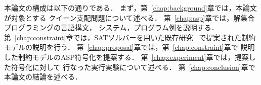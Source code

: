 本論文の構成は以下の通りである．
まず，第~\ref{chap:background}章では，本論文が対象とする
クイーン支配問題について述べる．
第~\ref{chap:asp}章では，解集合プログラミングの言語構文，
システム，プログラム例を説明する．
第~\ref{chap:constraint}章では，SATソルバーを用いた既存研究~\cite{yamamoto21}
で提案された制約モデルの説明を行う．
第~\ref{chap:proposal}章では，第~\ref{chap:constraint}章で
説明した制約モデルのASP符号化を提案する．
第~\ref{chap:experiment}章では，提案した符号化に対して
行なった実行実験について述べる．
第~\ref{chap:conclusion}章で本論文の結論を述べる．

